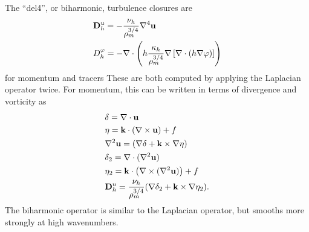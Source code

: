 The ``del4'', or biharmonic, turbulence closures are
\begin{eqnarray}
\label{ocean:h_mom_del4}
& {\bf D}^u_h=-\displaystyle\frac{\nu_h}{\rho_m^{3/4}} \nabla^4 {\bf u} \\
\label{ocean:h_tr_del4}
& D^\varphi_h = -\nabla\cdot\left(h \displaystyle\frac{\kappa_h}{\rho_m^{3/4}} \nabla \left[\nabla\cdot\left(h \nabla\varphi \right) \right] \right)
\end{eqnarray}
for momentum and tracers  These are both computed by applying the Laplacian operator twice.  For momentum, this can be written in terms of divergence and vorticity as
\begin{eqnarray}
&\delta=\nabla\cdot{\bf u}\\
&\eta={\bf k} \cdot \left( \nabla \times {\bf u} \right)+f\\
\label{ocean:h_mom_del4a}
&\nabla^2{\bf u}=(\nabla \delta + {\bf k}\times \nabla \eta) \\
&\delta_2=\nabla\cdot(\nabla^2{\bf u})\\
&\eta_2={\bf k} \cdot \left( \nabla \times (\nabla^2{\bf u}) \right)+f\\
\label{ocean:h_mom_del4b}
& {\bf D}^u_h= \displaystyle\frac{\nu_h}{\rho_m^{3/4}} (\nabla \delta_2 + {\bf k}\times \nabla \eta_2).
\end{eqnarray}
The biharmonic operator is similar to the Laplacian operator, but smooths more strongly at high wavenumbers.  
